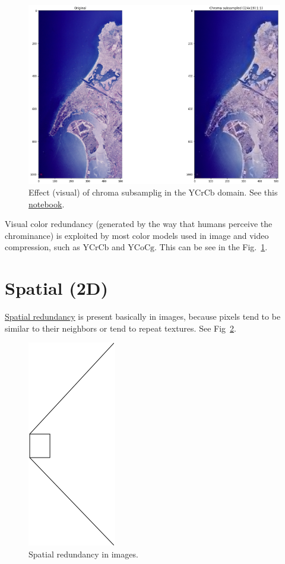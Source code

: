 \begin{figure}
  \centering
  \includegraphics{san-diego_chroma_subsampled}
  \caption{Effect (visual) of chroma subsamplig in the $\text{YCrCb}$ domain. See
    this
    \href{https://github.com/vicente-gonzalez-ruiz/visual_redundancy/blob/master/chroma_subsampling.ipynb}{notebook}.}
  \label{fig:san-diego_chroma_subsampled}
\end{figure}

Visual color redundancy (generated by the way that humans perceive the
chrominance) is exploited by most color models used in image and video
compression, such as $\text{YCrCb}$ and $\text{YCoCg}$. This can be
see in the Fig.~\ref{fig:san-diego_chroma_subsampled}.

\section{Spatial (2D)}
\href{https://robbfoxx.wordpress.com/2015/07/12/discussion-6-2-1-what-is-redundancy-temporal-redundancy-and-spatial-redundancy/}{Spatial
  redundancy} is present basically in images, because pixels tend to
be similar to their neighbors or tend to repeat textures. See
Fig~\ref{fig:correlacion_lena}.

\begin{figure}
  \includegraphics{graphics/correlacion_lena}
  \caption{Spatial redundancy in images.}
  \label{fig:correlacion_lena}
\end{figure}

